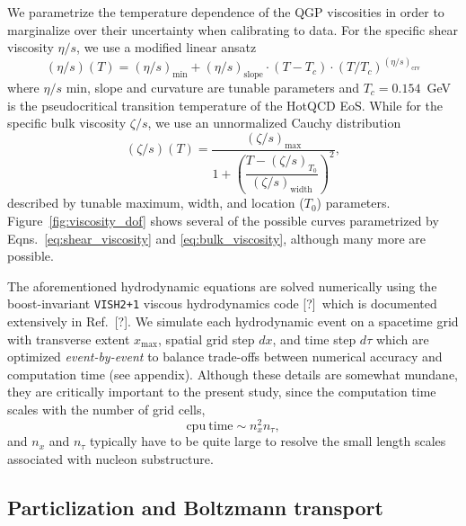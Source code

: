 \documentclass[aps,prc,reprint,amsmath,nofootinbib]{revtex4-1}
\newcommand{\note}{\textcolor{theblue}{[?]}}
\begin{document}
We parametrize the temperature dependence of the QGP viscosities in order to marginalize over their uncertainty when calibrating to data.
For the specific shear viscosity $\eta/s$, we use a modified linear ansatz
\begin{equation}
  \label{eq:shear_viscosity}
  (\eta/s)(T) = (\eta/s)_\mathrm{min} + (\eta/s)_\mathrm{slope}\cdot(T - T_c)\cdot(T/T_c)^{(\eta/s)_\mathrm{crv}}
\end{equation}
where $\eta/s$ min, slope and curvature are tunable parameters and $T_c=0.154$~GeV is the pseudocritical transition temperature of the HotQCD EoS.
While for the specific bulk viscosity $\zeta/s$, we use an unnormalized Cauchy distribution
\begin{equation}
  \label{eq:bulk_viscosity}
  (\zeta/s)(T) = \frac{(\zeta/s)_\mathrm{max}}{1 + \left(\dfrac{T - (\zeta/s)_{T_0}}{(\zeta/s)_\mathrm{width}}\right)^2},
\end{equation}
described by tunable maximum, width, and location ($T_0$) parameters.
Figure~\ref{fig:viscosity_dof} shows several of the possible curves parametrized by Eqns.~\eqref{eq:shear_viscosity} and \eqref{eq:bulk_viscosity}, although many more are possible.

The aforementioned hydrodynamic equations are solved numerically using the boost-invariant \texttt{VISH2+1} viscous hydrodynamics code \note\ which is documented extensively in Ref.~\note.
We simulate each hydrodynamic event on a spacetime grid with transverse extent $x_\mathrm{max}$, spatial grid step $dx$, and time step $d\tau$ which are optimized \emph{event-by-event} to balance trade-offs between numerical accuracy and computation time (see appendix).
Although these details are somewhat mundane, they are critically important to the present study, since the computation time scales with the number of grid cells,
\begin{equation}
  \mathrm{cpu~time} \sim n_x^2 n_\tau,
\end{equation}
and $n_x$ and $n_\tau$ typically have to be quite large to resolve the small length scales associated with nucleon substructure.

\subsection{Particlization and Boltzmann transport}
\end{document}
